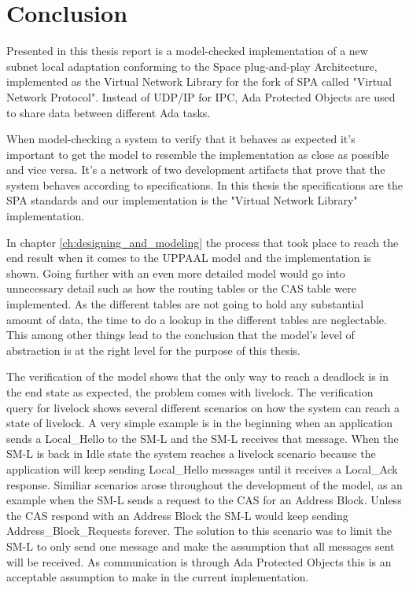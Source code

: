 \chapter{Conclusion}\label{ch:conclusion}
Presented in this thesis report is a model-checked implementation of a new
subnet local adaptation conforming to the Space plug-and-play Architecture,
implemented as the Virtual Network Library \cite{web:github-vn-lib} for the
fork of SPA called "Virtual Network Protocol". Instead of UDP/IP for IPC, Ada
Protected Objects are used to share data between different Ada tasks.

When model-checking a system to verify that it behaves as expected it's
important to get the model to resemble the implementation as close as possible
and vice versa. It's a network of two development artifacts that prove that the
system behaves according to specifications. In this thesis the specifications
are the SPA standards and our implementation is the "Virtual Network Library"
implementation.

In chapter \ref{ch:designing_and_modeling} the process that took place to reach
the end result when it comes to the UPPAAL model and the implementation is
shown. Going further with an even more detailed model would go into
unnecessary detail such as how the routing tables or the CAS table were
implemented. As the different tables are not going to hold any substantial
amount of data, the time to do a lookup in the different tables are
neglectable. This among other things lead to the conclusion that the model's
level of abstraction is at the right level for the purpose of this thesis.

The verification of the model shows that the only way to reach a deadlock is in
the end state as expected, the problem comes with livelock. The
verification query for livelock shows several different scenarios on how the
system can reach a state of livelock. A very simple example is in the beginning
when an application sends a Local\_Hello to the SM-L and the SM-L receives that
message. When the SM-L is back in Idle state the system reaches a livelock
scenario because the application will keep sending Local\_Hello messages
until it receives a Local\_Ack response. Similiar scenarios arose throughout
the development of the model, as an example when the SM-L sends a request to
the CAS for an Address Block. Unless the CAS respond with an Address Block the
SM-L would keep sending Address\_Block\_Requests forever. The solution to this
scenario was to limit the SM-L to only send one message and make the
assumption that all messages sent will be received. As communication is through
Ada Protected Objects this is an acceptable assumption to make in the current
implementation.

